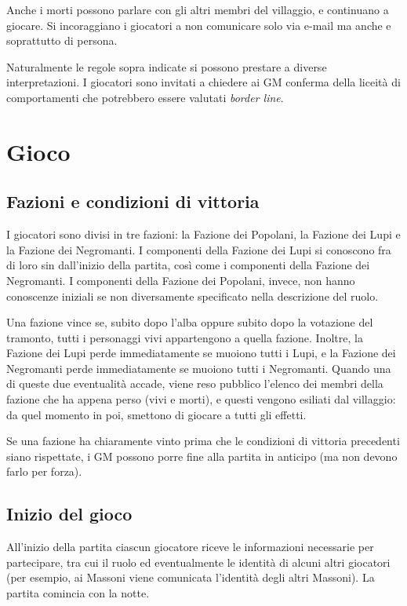 \documentclass[a4paper,10pt]{article}
\begin{document}
Anche i morti possono parlare con gli altri membri del villaggio, e continuano a giocare. Si incoraggiano i giocatori a non comunicare solo via e-mail ma anche e soprattutto di persona.

Naturalmente le regole sopra indicate si possono prestare a diverse interpretazioni. I giocatori sono invitati a chiedere ai GM conferma della liceità di comportamenti che potrebbero essere valutati \emph{border line}.
\pagebreak

\section{Gioco}

\subsection{Fazioni e condizioni di vittoria}

I giocatori sono divisi in tre fazioni: la Fazione dei Popolani, la Fazione dei Lupi e la Fazione dei Negromanti. I componenti della Fazione dei Lupi si conoscono fra di loro sin dall'inizio della partita, così come i componenti della Fazione dei Negromanti. I componenti della Fazione dei Popolani, invece, non hanno conoscenze iniziali se non diversamente specificato nella descrizione del ruolo.

Una fazione vince se, subito dopo l'alba oppure subito dopo la votazione del tramonto, tutti i personaggi vivi appartengono a quella fazione. Inoltre, la Fazione dei Lupi perde immediatamente se muoiono tutti i Lupi, e la Fazione dei Negromanti perde immediatamente se muoiono tutti i Negromanti. Quando una di queste due eventualità accade, viene reso pubblico l'elenco dei membri della fazione che ha appena perso (vivi e morti), e questi vengono esiliati dal villaggio: da quel momento in poi, smettono di giocare a tutti gli effetti.

Se una fazione ha chiaramente vinto prima che le condizioni di vittoria precedenti siano rispettate, i GM possono porre fine alla partita in anticipo (ma non devono farlo per forza).

\subsection{Inizio del gioco}

All'inizio della partita ciascun giocatore riceve le informazioni necessarie per partecipare, tra cui il ruolo ed eventualmente le identità di alcuni altri giocatori (per esempio, ai Massoni viene comunicata l'identità degli altri Massoni). La partita comincia con la notte.
\end{document}
